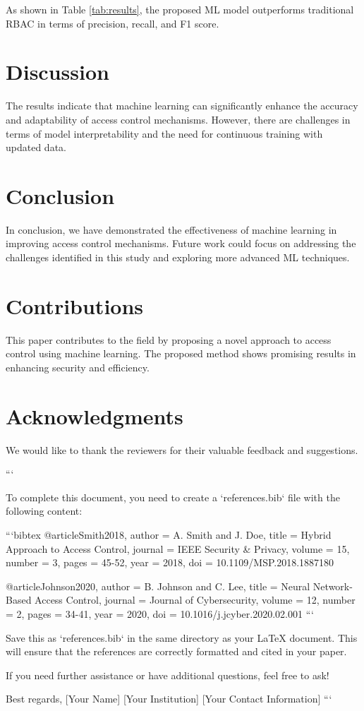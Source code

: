 As shown in Table \ref{tab:results}, the proposed ML model outperforms traditional RBAC in terms of precision, recall, and F1 score.

\section{Discussion}
The results indicate that machine learning can significantly enhance the accuracy and adaptability of access control mechanisms. However, there are challenges in terms of model interpretability and the need for continuous training with updated data.

\section{Conclusion}
In conclusion, we have demonstrated the effectiveness of machine learning in improving access control mechanisms. Future work could focus on addressing the challenges identified in this study and exploring more advanced ML techniques.

\section{Contributions}
This paper contributes to the field by proposing a novel approach to access control using machine learning. The proposed method shows promising results in enhancing security and efficiency.

\section*{Acknowledgments}
We would like to thank the reviewers for their valuable feedback and suggestions.





```

To complete this document, you need to create a `references.bib` file with the following content:

```bibtex
@article{Smith2018,
  author    = {A. Smith and J. Doe},
  title     = {Hybrid Approach to Access Control},
  journal   = {IEEE Security \& Privacy},
  volume    = {15},
  number    = {3},
  pages     = {45-52},
  year      = {2018},
  doi       = {10.1109/MSP.2018.1887180}
}

@article{Johnson2020,
  author    = {B. Johnson and C. Lee},
  title     = {Neural Network-Based Access Control},
  journal   = {Journal of Cybersecurity},
  volume    = {12},
  number    = {2},
  pages     = {34-41},
  year      = {2020},
  doi       = {10.1016/j.jcyber.2020.02.001}
}
```

Save this as `references.bib` in the same directory as your LaTeX document. This will ensure that the references are correctly formatted and cited in your paper. 

If you need further assistance or have additional questions, feel free to ask! 

Best regards,  
[Your Name]  
[Your Institution]  
[Your Contact Information]  
```